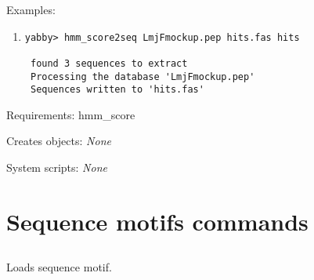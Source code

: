 \begin{description}

\item{Examples:}
\begin{enumerate}

\item
\begin{verbatim}
yabby> hmm_score2seq LmjFmockup.pep hits.fas hits

 found 3 sequences to extract
 Processing the database 'LmjFmockup.pep'
 Sequences written to 'hits.fas'

\end{verbatim}

\end{enumerate}


\item{Requirements:} hmm\_score


\item{Creates objects:} {\em None}


\item{System scripts:} {\em None}

\end{description}


\section{Sequence motifs commands}


\subsection[motif\_load]{  }



Loads sequence motif.


